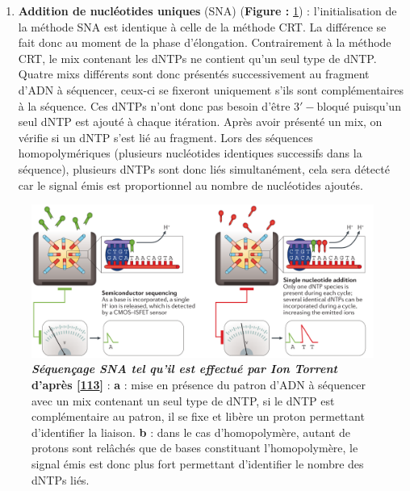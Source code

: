 \documentclass[12pt,a4paper,twoside]{ugathesis}
\providecommand{\tightlist}{%
  \setlength{\itemsep}{0pt}\setlength{\parskip}{0pt}}
\theoremstyle{definition}
\theoremstyle{definition}
\theoremstyle{definition}
\theoremstyle{remark}
\begin{document}
\newpage

\begin{enumerate}
\def\labelenumi{\alph{enumi}.}
\setcounter{enumi}{1}
\tightlist
\item
  \textbf{Addition de nucléotides uniques} (SNA) (\textbf{Figure :
  }\ref{fig:pictsnaSeq}) : l'initialisation de la méthode SNA est
  identique à celle de la méthode CRT. La différence se fait donc au
  moment de la phase d'élongation. Contrairement à la méthode CRT, le
  mix contenant les dNTPs ne contient qu'un seul type de dNTP. Quatre
  mixs différents sont donc présentés successivement au fragment d'ADN à
  séquencer, ceux-ci se fixeront uniquement s'ils sont complémentaires à
  la séquence. Ces dNTPs n'ont donc pas besoin d'être
  \(\mathrm{3'-bloqué}\) puisqu'un seul dNTP est ajouté à chaque
  itération. Après avoir présenté un mix, on vérifie si un dNTP s'est
  lié au fragment. Lors des séquences homopolymériques (plusieurs
  nucléotides identiques successifs dans la séquence), plusieurs dNTPs
  sont donc liés simultanément, cela sera détecté car le signal émis est
  proportionnel au nombre de nucléotides ajoutés.
\end{enumerate}

\begin{figure}

{\centering \includegraphics[scale=.26]{figure/SNA_seq_ionTorrent} 

}

\caption[Séquençage SNA tel qu'il est effectué par Ion Torrent]{\textbf{\emph{Séquençage SNA tel qu'il est effectué par
Ion Torrent} d'après {[}\protect\hyperlink{ref-Goodwin2016}{113}{]}} :
\textbf{a} : mise en présence du patron d'ADN à séquencer avec un mix
contenant un seul type de dNTP, si le dNTP est complémentaire au patron,
il se fixe et libère un proton permettant d'identifier la liaison.
\textbf{b} : dans le cas d'homopolymère, autant de protons sont relâchés
que de bases constituant l'homopolymère, le signal émis est donc plus
fort permettant d'identifier le nombre des dNTPs liés.}\label{fig:pictsnaSeq}
\end{figure}
\end{document}
